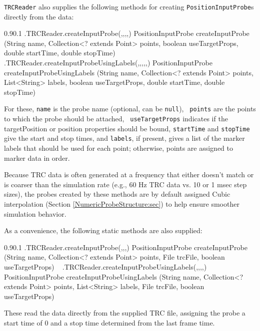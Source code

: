 {\tt TRCReader} also supplies the following methods for
creating {\tt PositionInputProbe}s directly from the data:
%
\begin{methodtable}{0.9}{0.1}
\midline
%
\methodentry
{\probes.TRCReader.createInputProbe(,,,,)}%
{PositionInputProbe createInputProbe (String name, 
Collection<? extends Point> points,\brh
boolean useTargetProps, double startTime, double stopTime)}%
{\ }%
\methodspace{0.5em}%
%
\methodentry
{\probes.TRCReader.createInputProbeUsingLabels(,,,,,)}%
{PositionInputProbe createInputProbeUsingLabels (String name, 
Collection<? extends Point> points,\brh
List<String> labels, boolean useTargetProps, double startTime, double stopTime)}%
{\ }%
%
\midline
\end{methodtable}
%
For these, {\tt name} is the probe name (optional, can be {\tt null}), {\tt
points} are the points to which the probe should be attached, {\tt
useTargetProps} indicates if the {\sf targetPosition} or {\sf position}
properties should be bound, {\tt startTime} and {\tt stopTime} give the
start and stop times, and {\tt labels}, if present, gives a list of the marker
labels that should be used for each point; otherwise, points are assigned to
marker data in order.

\begin{sideblock}
Because TRC data is often generated at a frequency that either doesn't
match or is coarser than the simulation rate (e.g., 60 Hz TRC data
vs. 10 or 1 msec step sizes), the probes created by these methods are
by default assigned {\sf Cubic} interpolation
(Section \ref{NumericProbeStructure:sec}) to help ensure smoother
simulation behavior.
\end{sideblock}

As a convenience, the following static methods are also supplied:

\begin{methodtable}{0.9}{0.1}
%
\methodentry
{\probes.TRCReader.createInputProbe(,,,)}%
{PositionInputProbe createInputProbe (String name, 
Collection<? extends Point> points,\brh
File trcFile, boolean useTargetProps)}%
{\ }%
%
\methodspace{0.5em}%
%
\methodentry
{\probes.TRCReader.createInputProbeUsingLabels(,,,,)}%
{PositionInputProbe createInputProbeUsingLabels (String name, 
Collection<? extends Point> points,\brh
List<String> labels, File trcFile, boolean useTargetProps)}%
{\ }%
%
\end{methodtable}
%
These read the data directly from the supplied TRC file, assigning the probe a
start time of 0 and a stop time determined from the last frame time.

